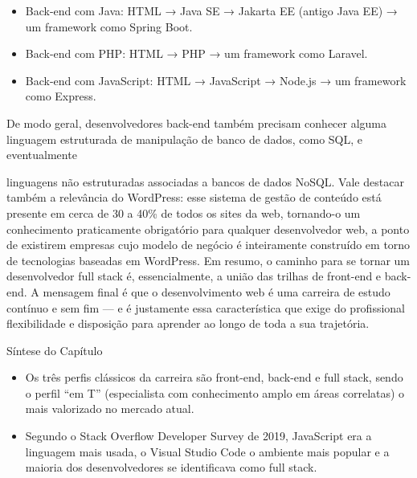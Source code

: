 \begin{itemize}
  \item Back-end com Java: HTML → Java SE → Jakarta EE (antigo Java EE) → um framework como Spring Boot.
\end{itemize}

\begin{itemize}
  \item Back-end com PHP: HTML → PHP → um framework como Laravel.
\end{itemize}

\begin{itemize}
  \item Back-end com JavaScript: HTML → JavaScript → Node.js → um framework como Express.
\end{itemize}

De modo geral, desenvolvedores back-end também precisam conhecer alguma linguagem estruturada de manipulação de banco de dados, como SQL, e eventualmente

linguagens não estruturadas associadas a bancos de dados NoSQL. Vale destacar também a relevância do WordPress: esse sistema de gestão de conteúdo está presente em cerca de 30 a 40\% de todos os sites da web, tornando-o um conhecimento praticamente obrigatório para qualquer desenvolvedor web, a ponto de existirem empresas cujo modelo de negócio é inteiramente construído em torno de tecnologias baseadas em WordPress. Em resumo, o caminho para se tornar um desenvolvedor full stack é, essencialmente, a união das trilhas de front-end e back-end. A mensagem final é que o desenvolvimento web é uma carreira de estudo contínuo e sem fim — e é justamente essa característica que exige do profissional flexibilidade e disposição para aprender ao longo de toda a sua trajetória.

Síntese do Capítulo

\begin{itemize}
  \item Os três perfis clássicos da carreira são front-end, back-end e full stack, sendo o perfil “em T” (especialista com conhecimento amplo em áreas correlatas) o mais valorizado no mercado atual.
\end{itemize}

\begin{itemize}
  \item Segundo o Stack Overflow Developer Survey de 2019, JavaScript era a linguagem mais usada, o Visual Studio Code o ambiente mais popular e a maioria dos desenvolvedores se identificava como full stack.
\end{itemize}

